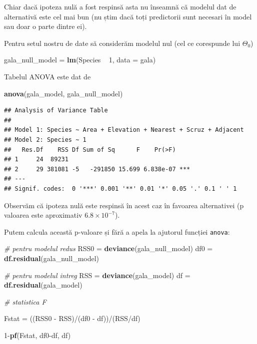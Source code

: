 \documentclass[]{article}
\newenvironment{Shaded}{\begin{snugshade}}{\end{snugshade}}
\newcommand{\KeywordTok}[1]{\textcolor[rgb]{0.13,0.29,0.53}{\textbf{{#1}}}}
\newcommand{\DataTypeTok}[1]{\textcolor[rgb]{0.13,0.29,0.53}{{#1}}}
\newcommand{\DecValTok}[1]{\textcolor[rgb]{0.00,0.00,0.81}{{#1}}}
\newcommand{\StringTok}[1]{\textcolor[rgb]{0.31,0.60,0.02}{{#1}}}
\newcommand{\CommentTok}[1]{\textcolor[rgb]{0.56,0.35,0.01}{\textit{{#1}}}}
\newcommand{\NormalTok}[1]{{#1}}
\begin{document}
Chiar dacă ipoteza nulă a fost respinsă asta nu înseamnă că modelul dat
de alternativă este cel mai bun (nu știm dacă toți predictorii sunt
necesari în model sau doar o parte dintre ei).

Pentru setul nostru de date să considerăm modelul nul (cel ce corespunde
lui \(\Theta_0\))

\begin{Shaded}
\begin{Highlighting}[]
\NormalTok{gala_null_model =}\StringTok{ }\KeywordTok{lm}\NormalTok{(Species ~}\StringTok{ }\DecValTok{1}\NormalTok{, }\DataTypeTok{data =} \NormalTok{gala)}
\end{Highlighting}
\end{Shaded}

Tabelul ANOVA este dat de

\begin{Shaded}
\begin{Highlighting}[]
\KeywordTok{anova}\NormalTok{(gala_model, gala_null_model)}
\end{Highlighting}
\end{Shaded}

\begin{verbatim}
## Analysis of Variance Table
## 
## Model 1: Species ~ Area + Elevation + Nearest + Scruz + Adjacent
## Model 2: Species ~ 1
##   Res.Df    RSS Df Sum of Sq      F    Pr(>F)    
## 1     24  89231                                  
## 2     29 381081 -5   -291850 15.699 6.838e-07 ***
## ---
## Signif. codes:  0 '***' 0.001 '**' 0.01 '*' 0.05 '.' 0.1 ' ' 1
\end{verbatim}

Observăm că ipoteza nulă este respinsă în acest caz în favoarea
alternativei (p valoarea este aproximativ \(6.8\times 10^{-7}\)).

Putem calcula această p-valoare și fără a apela la ajutorul funcției
\texttt{anova}:

\begin{Shaded}
\begin{Highlighting}[]
\CommentTok{# pentru modelul redus }
\NormalTok{RSS0 =}\StringTok{ }\KeywordTok{deviance}\NormalTok{(gala_null_model)}
\NormalTok{df0 =}\StringTok{ }\KeywordTok{df.residual}\NormalTok{(gala_null_model)}

\CommentTok{# pentru modelul intreg}
\NormalTok{RSS =}\StringTok{ }\KeywordTok{deviance}\NormalTok{(gala_model)}
\NormalTok{df =}\StringTok{ }\KeywordTok{df.residual}\NormalTok{(gala_model)}

\CommentTok{# statistica F}

\NormalTok{Fstat =}\StringTok{ }\NormalTok{((RSS0 -}\StringTok{ }\NormalTok{RSS)/(df0 -}\StringTok{ }\NormalTok{df))/(RSS/df)}

\DecValTok{1}\NormalTok{-}\KeywordTok{pf}\NormalTok{(Fstat, df0-df, df)}
\end{Highlighting}
\end{Shaded}
\end{document}
